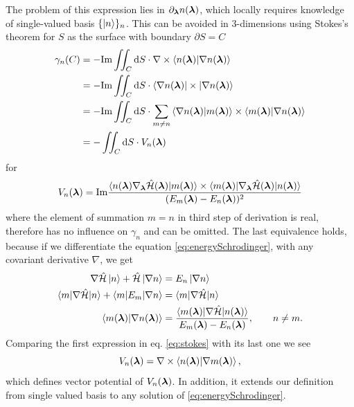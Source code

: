 The problem of this expression lies in $\partial_{\bm\lambda} n({\bm\lambda})$, which locally requires knowledge of single-valued basis $\{\ket{n}\}_n$. This can be avoided in 3-dimensions using Stokes's theorem for $S$ as the surface with boundary $\partial S=C$
\begin{equation}
    \begin{split}
        \gamma_n(C) &= -\textrm{Im} \iint_C \mathrm{d} S \cdot \nabla \times \braket{n({\bm\lambda})|\nabla n({\bm\lambda})}\\
         &= -\textrm{Im} \iint_C \mathrm{d} S \cdot \braket{\nabla n({\bm\lambda})|\times|\nabla n({\bm\lambda})}\\
        &= -\textrm{Im} \iint_C \mathrm{d} S \cdot \sum_{m\neq n} \braket{\nabla n({\bm\lambda})|m({\bm\lambda})}\times \braket{m({\bm\lambda})|\nabla n({\bm\lambda})}\\
        &= -\iint_C \mathrm{d} S \cdot V_n({\bm\lambda})
            \label{eq:stokes}
    \end{split}
\end{equation}
for 
\begin{equation}
    V_n({\bm\lambda}) = \textrm{Im} \frac{
            \braket{n({\bm\lambda})\nabla_{\bm\lambda} \hat{\mathcal{H}}({\bm\lambda}) |m({\bm\lambda})}\times \braket{m({\bm\lambda})|\nabla_{\bm\lambda} \hat{\mathcal{H}}({\bm\lambda})|n({\bm\lambda})}    
             }{
(E_m({\bm\lambda})-E_n({\bm\lambda}))^2
            }
\end{equation}
where the element of summation $m=n$ in third step of derivation is real, therefore has no influence on $\gamma_n$ and can be omitted. The last equivalence holds, because if we differentiate the \Schrodinger equation \ref{eq:energySchrodinger},  with any covariant derivative $\nabla$, we get 
\begin{equation}
    \begin{split}
        \nabla \hat{\mathcal{H}}\ket{n}+\hat{\mathcal{H}} \ket{\nabla n} &= E_n\ket{\nabla n}\\
        \braket{m|\nabla \hat{\mathcal{H}}|n}+\braket{m|E_m|\nabla n} &= \braket{m|\nabla \hat{\mathcal{H}}|n}\\
        \braket{m({\bm\lambda})|\nabla n({\bm\lambda})}&=
        \frac{\braket{m({\bm\lambda})|\nabla \hat{\mathcal{H}} |n({\bm\lambda})}}
        { E_m({\bm\lambda})-E_n({\bm\lambda})}, \qquad n\neq m.
    \end{split}
\end{equation}
Comparing the first expression in eq. \ref{eq:stokes} with its last one we see
\begin{equation}
    V_n({\bm\lambda})=\nabla\times\braket{n({\bm\lambda})|\nabla m({\bm\lambda})}, 
    \label{eq:vectorPotentialDef}  
\end{equation}
which defines vector potential of $V_n({\bm\lambda})$. In addition, it extends our definition from single valued basis to any solution of \ref{eq:energySchrodinger}.


